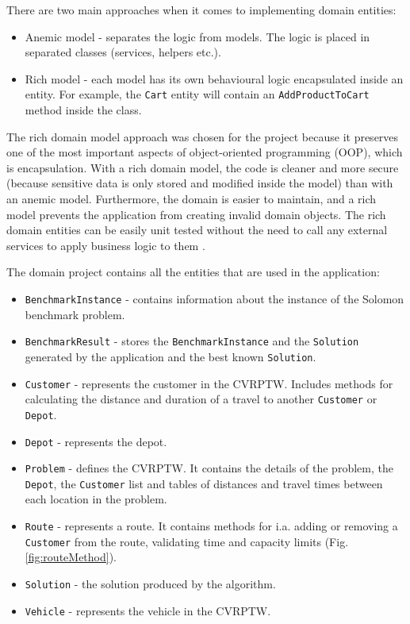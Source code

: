 \documentclass[a4paper,twoside,12pt]{book}
\begin{document}
There are two main approaches when it comes to implementing domain entities:
\begin{itemize}
    \item Anemic model - separates the logic from models. The logic is placed in separated classes (services, helpers etc.).
    \item Rich model - each model has its own behavioural logic encapsulated inside an entity.  For example, the \lstinline|Cart| entity will contain an \lstinline|AddProductToCart| method inside the class.
\end{itemize}

The rich domain model approach was chosen for the project because it preserves one of the most important aspects of object-oriented programming (OOP), which is encapsulation. With a rich domain model, the code is cleaner and more secure (because sensitive data is only stored and modified inside the model) than with an anemic model. Furthermore, the domain is easier to maintain, and a rich model prevents the application from creating invalid domain objects. The rich domain entities can be easily unit tested without the need to call any external services to apply business logic to them \cite{bib:richAnemic}.

The domain project contains all the entities that are used in the application: 
\begin{itemize}
    \item \lstinline|BenchmarkInstance| - contains information about the instance of the Solomon benchmark problem.
    \item \lstinline|BenchmarkResult| - stores the \lstinline|BenchmarkInstance| and the \lstinline|Solution| generated by the application and the best known \lstinline|Solution|.
    \item \lstinline|Customer| - represents the customer in the CVRPTW. Includes methods for calculating the distance and duration of a travel to another \lstinline|Customer| or \lstinline|Depot|.
    \item \lstinline|Depot| - represents the depot.
    \item \lstinline|Problem| - defines the CVRPTW. It contains the details of the problem, the \lstinline|Depot|, the \lstinline|Customer| list and tables of distances and travel times between each location in the problem.
    \item \lstinline|Route| -  represents a route. It contains methods for i.a. adding or removing a \lstinline|Customer| from the route, validating time and capacity limits (Fig. \ref{fig:routeMethod}).
    \item \lstinline|Solution| - the solution produced by the algorithm.
    \item \lstinline|Vehicle| -  represents the vehicle in the CVRPTW.   
\end{itemize}
\end{document}
